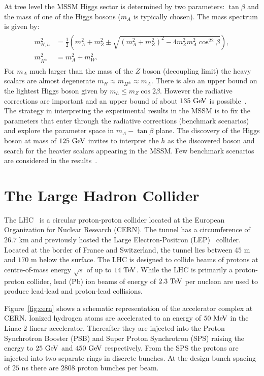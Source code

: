 At tree level the MSSM Higgs sector is determined by two parameters: $\tan \beta$ and the mass of one of the Higgs bosons ($m_{A}$ is typically chosen). The mass spectrum is given by:
\begin{eqnarray} \label{eq:mssm_mass}
\begin{aligned}
m_{H,h}^2 &= \frac{1}{2} (m_A^2 + m_Z^2 \pm \sqrt{(m_A^2+m_Z^2)^2-4m_Z^2m_A^2\cos^22\beta}), \\
m_{H^{\pm}}^2 &= m_{A}^2 + m_{W}^2.
\end{aligned}
\end{eqnarray}   
For $m_{A}$ much larger than the mass of the $Z$ boson (decoupling limit) the heavy scalars are almost degenerate $m_{H} \approx m_{H^{\pm}} \approx m_{A}$. There is also an upper bound on the lightest Higgs boson given by $m_{h} \leq m_{Z} \cos 2\beta$. However the radiative corrections are important and an upper bound of about $135~\mathrm{Ge\kern -0.1em V}$ is possible~\cite{Degrassi:2002fi}. The strategy in interpreting the experimental results in the MSSM is to fix the parameters that enter through the radiative corrections (benchmark scenarios) and explore the parameter space in $m_{A}-\tan \beta$ plane. The discovery of the Higgs boson at mass of $125~\mathrm{Ge\kern -0.1em V}$ invites to interpret the $h$ as the discovered boson and search for the heavier scalars appearing in the MSSM. Few benchmark scenarios are considered in the results~\cite{Heinemeyer:2011aa,Carena:2013ytb}.

\section{The Large Hadron Collider}
The LHC~\cite{1748-0221-3-08-S08001} is a circular proton-proton collider located at the European Organization for Nuclear Research (CERN). The tunnel has a circumference of $26.7$ km and previously hosted the Large Electron-Positron (LEP)~\cite{lep1,lep2} collider. Located at the border of France and Switzerland, the tunnel lies between $45$ m and $170$ m below the surface. The LHC is designed to collide beams of protons at centre-of-mass energy $\sqrt{s}$ of up to $14~\mathrm{Te\kern -0.1em V}$. While the LHC is primarily a proton-proton collider, lead (Pb) ion beams of energy of $2.3~\mathrm{Te\kern -0.1em V}$ per nucleon are used to produce lead-lead  and proton-lead collisions.  
 
Figure~\ref{fig:cern} shows a schematic representation of the accelerator complex at CERN. Ionized hydrogen atoms are accelerated to an energy of $50~\mathrm{Me\kern -0.1em V}$ in the Linac $2$ linear accelerator. Thereafter they are injected into the Proton Synchrotron Booster (PSB) and Super Proton Synchrotron (SPS) raising the energy to $25~\mathrm{Ge\kern -0.1em V}$ and $450~\mathrm{Ge\kern -0.1em V}$ respectively. From the SPS the protons are injected into two separate rings in discrete bunches. At the design bunch spacing of $25$ ns there are $2808$ proton bunches per beam. 

